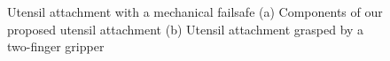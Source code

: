 \begin{figure}[t]
    \centering
    \hfill
    \caption{Utensil attachment with a mechanical failsafe (a) Components of our proposed utensil attachment (b) Utensil attachment grasped by a two-finger gripper}
\end{figure}